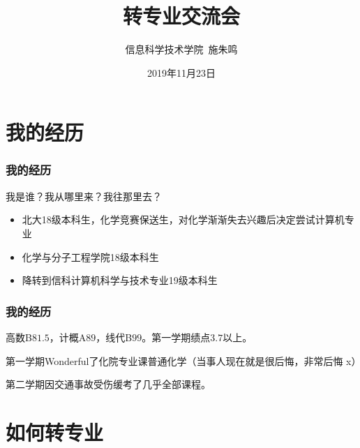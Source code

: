 \documentclass[12pt,AutoFakeBold]{beamer}
\author{信息科学技术学院\ 施朱鸣}
\title{转专业交流会}
\date{2019年11月23日}
\begin{document}
    \frame[plain]{\titlepage}
    \section{我的经历}
    \begin{frame}
        \frametitle{我的经历}
        我是谁？我从哪里来？我往那里去？
        \begin{itemize}
            \item 北大18级本科生，化学竞赛保送生，对化学渐渐失去兴趣后决定尝试计算机专业
            \item 化学与分子工程学院18级本科生
            \item 降转到信科计算机科学与技术专业19级本科生
        \end{itemize}
    \end{frame}
    \begin{frame}
        \frametitle{我的经历}
        高数B$81.5$，计概A$89$，线代B$99$。第一学期绩点$3.7$以上。

        第一学期Wonderful了化院专业课普通化学（当事人现在就是很后悔，非常后悔 x）

        第二学期因交通事故受伤缓考了几乎全部课程。
    \end{frame}
    \section{如何转专业}
\end{document}

